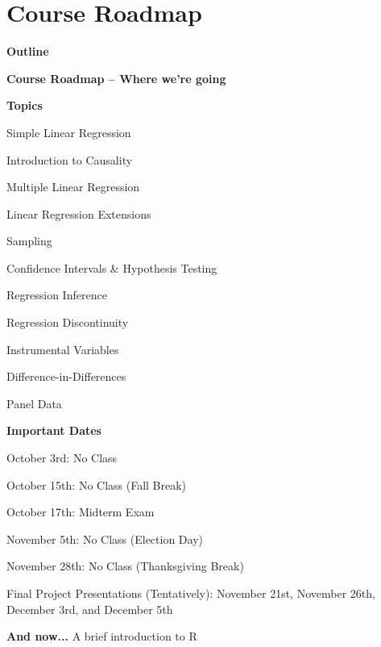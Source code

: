 \documentclass[11pt, aspectratio=169]{beamer}
\newenvironment{wideitemize}{\itemize\addtolength{\itemsep}{5pt}}{\enditemize}
\newenvironment{wideenumerate}{\enumerate\addtolength{\itemsep}{5pt}}{\endenumerate}
\begin{document}
\section{Course Roadmap}
	\begin{frame}{\bf \large Outline}
	\tableofcontents[currentsection]
\end{frame}
\begin{frame}{\bf \large Course Roadmap -- Where we're going}

\begin{minipage}{.5\textwidth}
\begin{wideitemize}
	\item \textbf{Topics}
	\begin{wideenumerate}
		\item Simple Linear Regression 
		\item Introduction to Causality
		\item Multiple Linear Regression
		\item Linear Regression Extensions
		\item Sampling
		\item Confidence Intervals \& Hypothesis Testing
		\item Regression Inference
		\item Regression Discontinuity
		\item Instrumental Variables
		\item Difference-in-Differences
		\item Panel Data
	\end{wideenumerate}
\end{wideitemize}
\end{minipage}\pause%
\begin{minipage}{.5\textwidth}
	\begin{wideitemize}
		\item \textbf{Important Dates}
		\begin{wideitemize}
			\item	October 3rd: No Class
			\item	October 15th: No Class (Fall Break)
			\item	October 17th: Midterm Exam
			\item	November 5th: No Class (Election Day)
			\item	November 28th: No Class (Thanksgiving Break)
			\item	Final Project Presentations (Tentatively): November 21st, November 26th, December 3rd, and December 5th 
		\end{wideitemize}
	\end{wideitemize}
\end{minipage}
\end{frame}

\begin{frame}{\bf \large And now...}
 \LARGE	A brief introduction to R
\end{frame}
\end{document}
